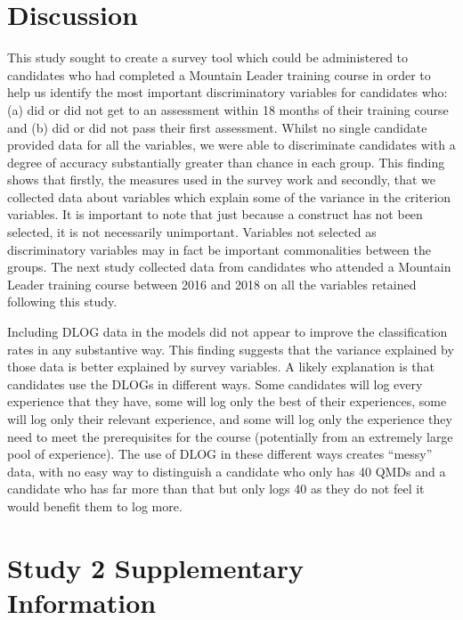 \documentclass[
  12pt,
  a4paper,
]{book}
\begin{document}
\hypertarget{survey-tool-dev-discussion}{%
\section{Discussion}\label{survey-tool-dev-discussion}}

This study sought to create a survey tool which could be administered to candidates who had completed a Mountain Leader training course in order to help us identify the most important discriminatory variables for candidates who: (a) did or did not get to an assessment within 18 months of their training course and (b) did or did not pass their first assessment. Whilst no single candidate provided data for all the variables, we were able to discriminate candidates with a degree of accuracy substantially greater than chance in each group. This finding shows that firstly, the measures used in the survey work and secondly, that we collected data about variables which explain some of the variance in the criterion variables. It is important to note that just because a construct has not been selected, it is not necessarily unimportant. Variables not selected as discriminatory variables may in fact be important commonalities between the groups. The next study collected data from candidates who attended a Mountain Leader training course between 2016 and 2018 on all the variables retained following this study.

Including DLOG data in the models did not appear to improve the classification rates in any substantive way. This finding suggests that the variance explained by those data is better explained by survey variables. A likely explanation is that candidates use the DLOGs in different ways. Some candidates will log every experience that they have, some will log only the best of their experiences, some will log only their relevant experience, and some will log only the experience they need to meet the prerequisites for the course (potentially from an extremely large pool of experience). The use of DLOG in these different ways creates ``messy'' data, with no easy way to distinguish a candidate who only has 40 QMDs and a candidate who has far more than that but only logs 40 as they do not feel it would benefit them to log more.

\hypertarget{study-2-supplementary-information}{%
\section{Study 2 Supplementary Information}\label{study-2-supplementary-information}}
\end{document}
